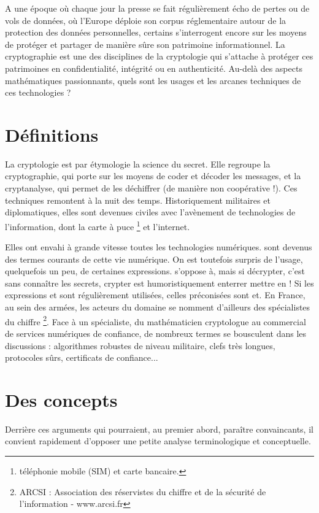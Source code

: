 

A une époque où chaque jour la presse se fait régulièrement écho de pertes ou de vols de données, où l'Europe déploie son corpus réglementaire autour de la protection des données personnelles, certains s'interrogent encore sur les moyens de protéger et partager de manière sûre son patrimoine informationnel. La cryptographie est une des disciplines de la cryptologie qui s'attache à protéger ces patrimoines en confidentialité, intégrité ou en authenticité. Au-delà des aspects mathématiques passionnants, quels sont les usages et les arcanes techniques de ces technologies ?

\section{Définitions}

 La cryptologie est par étymologie la science du secret. Elle regroupe la cryptographie, qui porte sur les moyens de coder et décoder les messages, et la cryptanalyse, qui permet de les déchiffrer (de manière non coopérative !).
Ces techniques remontent à la nuit des temps. Historiquement militaires et diplomatiques, elles sont devenues civiles avec l'avènement de technologies de l'information, dont la carte à puce \footnote{téléphonie mobile (SIM) et carte bancaire. } et l'internet.

Elles ont envahi à grande vitesse toutes les technologies numériques. sont devenus des termes courants de cette vie numérique. On est toutefois surpris de l'usage, quelquefois un peu, de certaines expressions. s'oppose à, mais si décrypter, c'est sans connaître les secrets, crypter est humoristiquement enterrer  mettre en ! Si les expressions et sont régulièrement utilisées, celles préconisées sont et. En France, au sein des armées, les acteurs du domaine se nomment d'ailleurs des spécialistes du chiffre \footnote{ARCSI : Association des réservistes du chiffre et de la sécurité de l'information - www.arcsi.fr}. Face à un spécialiste, du mathématicien cryptologue au commercial de services numériques de confiance, de nombreux termes se bousculent dans les discussions : algorithmes robustes de niveau militaire, clefs très longues, protocoles sûrs, certificats de confiance...

\section{Des concepts}
Derrière ces arguments qui pourraient, au premier abord, paraître convaincants, il convient rapidement d'opposer une petite analyse terminologique et conceptuelle.


